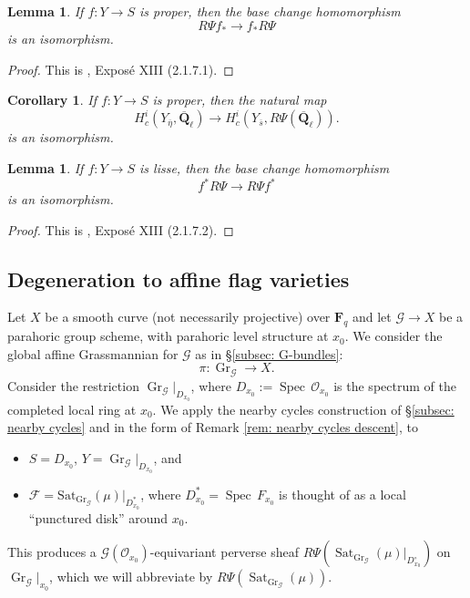 \documentclass[reqno]{amsart}
\numberwithin{equation}{section}
\newcommand{\F}{\mathbf{F}}
\newcommand{\Q}{\mathbf{Q}}
\newcommand{\ol}[1]{\overline{#1}}
\newcommand{\Cal}[1]{\mathcal{#1}}
\newcommand{\co}{\colon}
\newcommand{\mrm}[1]{\mathrm{#1}}
\DeclareMathOperator{\Spec}{Spec\,}
\DeclareMathOperator{\Gr}{Gr}
\DeclareMathOperator{\Sat}{Sat}
\newtheorem{lemma}[thm]{Lemma}
\newtheorem{cor}[thm]{Corollary}
\theoremstyle{remark}
\numberwithin{equation}{section}
\begin{document}
\begin{lemma}\label{nearby cycles proper}
If $f \co Y \rightarrow S$ is proper, then the base change homomorphism 
\[
 R\Psi f_* \rightarrow f_* R\Psi 
\]
is an isomorphism.
\end{lemma}

\begin{proof}
This is \cite{Del73}, Expos\'{e} XIII (2.1.7.1). 
\end{proof}



\begin{cor}\label{cor: nearby cycles = generic coh}
If $f \co Y \rightarrow S$ is proper, then the natural map
\[
H_c^i(Y_{\ol{\eta}}, \ol{\Q}_{\ell}) \rightarrow H_c^i(Y_{\ol{s}}, R \Psi(\ol{\Q}_{\ell})).
\] 
is an isomorphism. 
\end{cor}

\begin{lemma}\label{nearby cycles smooth}
If $f \co Y \rightarrow S$ is lisse, then the base change homomorphism 
\[
f^* R\Psi \rightarrow R\Psi f^*
\]
is an isomorphism.
\end{lemma}

\begin{proof}
This is \cite{Del73}, Expos\'{e} XIII (2.1.7.2). 
\end{proof}

\subsection{Degeneration to affine flag varieties}

Let $X$ be a smooth curve (not necessarily projective) over $\F_q$ and let $\Cal{G} \rightarrow X$ be a parahoric group scheme, with parahoric level structure at $x_0$. We consider the global affine Grassmannian for $\Cal{G}$ 
as in \S \ref{subsec: G-bundles}: 
\[
\pi \co \Gr_{\Cal{G}} \rightarrow X.
\]
Consider the restriction $\Gr_{\Cal{G}}|_{D_{x_0}}$, where $D_{x_0} := \Spec \Cal{O}_{x_0}$ is the spectrum of the completed local ring at $x_0$.  We apply the nearby cycles construction of \S \ref{subsec: nearby cycles} and in the form of Remark \ref{rem: nearby cycles descent}, to 
\begin{itemize}
\item $S = D_{x_0}$, $Y = \Gr_{\Cal{G}}|_{D_{x_0}}$, and 
\item $\Cal{F} = \mrm{Sat}_{\Gr_{\Cal{G}} }(\mu)|_{D_{x_0}^{*}}$, where $D_{x_0}^{*} = \Spec F_{x_0}$ is thought of as a local ``punctured disk'' around $x_0$. 
\end{itemize}
This produces a $\Cal{G}(\Cal{O}_{x_0})$-equivariant perverse sheaf $R \Psi(\Sat_{\Gr_{\Cal{G}}}(\mu)|_{D_{x_0}^{\circ}})$ on $\Gr_{\Cal{G}}|_{x_0}$, which we will abbreviate by $R \Psi(\Sat_{\Gr_{\Cal{G}}}(\mu))$. 
\end{document}

